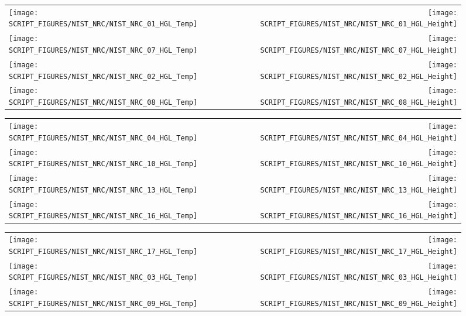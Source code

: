 \begin{figure}[!ht]
\begin{tabular*}{\textwidth}{l@{\extracolsep{\fill}}r}
\texttt{[image: SCRIPT\_FIGURES/NIST\_NRC/NIST\_NRC\_01\_HGL\_Temp]} &
\texttt{[image: SCRIPT\_FIGURES/NIST\_NRC/NIST\_NRC\_01\_HGL\_Height]} \\
\texttt{[image: SCRIPT\_FIGURES/NIST\_NRC/NIST\_NRC\_07\_HGL\_Temp]} &
\texttt{[image: SCRIPT\_FIGURES/NIST\_NRC/NIST\_NRC\_07\_HGL\_Height]} \\
\texttt{[image: SCRIPT\_FIGURES/NIST\_NRC/NIST\_NRC\_02\_HGL\_Temp]} &
\texttt{[image: SCRIPT\_FIGURES/NIST\_NRC/NIST\_NRC\_02\_HGL\_Height]} \\
\texttt{[image: SCRIPT\_FIGURES/NIST\_NRC/NIST\_NRC\_08\_HGL\_Temp]} &
\texttt{[image: SCRIPT\_FIGURES/NIST\_NRC/NIST\_NRC\_08\_HGL\_Height]}
\end{tabular*}
\end{figure}

\begin{figure}[!ht]
\begin{tabular*}{\textwidth}{l@{\extracolsep{\fill}}r}
\texttt{[image: SCRIPT\_FIGURES/NIST\_NRC/NIST\_NRC\_04\_HGL\_Temp]} &
\texttt{[image: SCRIPT\_FIGURES/NIST\_NRC/NIST\_NRC\_04\_HGL\_Height]} \\
\texttt{[image: SCRIPT\_FIGURES/NIST\_NRC/NIST\_NRC\_10\_HGL\_Temp]} &
\texttt{[image: SCRIPT\_FIGURES/NIST\_NRC/NIST\_NRC\_10\_HGL\_Height]} \\
\texttt{[image: SCRIPT\_FIGURES/NIST\_NRC/NIST\_NRC\_13\_HGL\_Temp]} &
\texttt{[image: SCRIPT\_FIGURES/NIST\_NRC/NIST\_NRC\_13\_HGL\_Height]} \\
\texttt{[image: SCRIPT\_FIGURES/NIST\_NRC/NIST\_NRC\_16\_HGL\_Temp]} &
\texttt{[image: SCRIPT\_FIGURES/NIST\_NRC/NIST\_NRC\_16\_HGL\_Height]}
\end{tabular*}
\end{figure}

\begin{figure}[!ht]
\begin{tabular*}{\textwidth}{l@{\extracolsep{\fill}}r}
\texttt{[image: SCRIPT\_FIGURES/NIST\_NRC/NIST\_NRC\_17\_HGL\_Temp]} &
\texttt{[image: SCRIPT\_FIGURES/NIST\_NRC/NIST\_NRC\_17\_HGL\_Height]} \\
\texttt{[image: SCRIPT\_FIGURES/NIST\_NRC/NIST\_NRC\_03\_HGL\_Temp]} &
\texttt{[image: SCRIPT\_FIGURES/NIST\_NRC/NIST\_NRC\_03\_HGL\_Height]} \\
\texttt{[image: SCRIPT\_FIGURES/NIST\_NRC/NIST\_NRC\_09\_HGL\_Temp]} &
\texttt{[image: SCRIPT\_FIGURES/NIST\_NRC/NIST\_NRC\_09\_HGL\_Height]}
\end{tabular*}
\end{figure}

